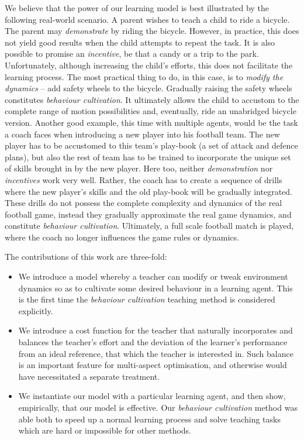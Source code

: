 We believe that the power of our learning model is best illustrated by
the following real-world scenario. A parent wishes to teach a child to
ride a bicycle. The parent may {\em demonstrate} by riding the
bicycle. However, in practice, this does not yield good results when
the child attempts to repeat the task. It is also possible to promise
an {\em incentive}, be that a candy or a trip to the
park. Unfortunately, although increasing the child's efforts, this
does not facilitate the learning process. The most practical thing to
do, in this case, is to {\em modify the dynamics} -- add safety wheels
to the bicycle. Gradually raising the safety wheels constitutes {\em
  behaviour cultivation}. It ultimately allows the child to accustom
to the complete range of motion possibilities and, eventually, ride an
unabridged bicycle version. Another good example, this time with
multiple agents, would be the task a coach faces when introducing a
new player into his football team. The new player has to be accustomed
to this team's play-book (a set of attack and defence plans), but also
the rest of team has to be trained to incorporate the unique set of
skills brought in by the new player. Here too, neither {\em
  demonstration} nor {\em incentives} work very well. Rather, the
coach has to create a sequence of drills where the new player's skills
and the old play-book will be gradually integrated. These drills do
not possess the complete complexity and dynamics of the real football
game, instead they gradually approximate the real game dynamics, and
constitute {\em behaviour cultivation}. Ultimately, a full scale
football match is played, where the coach no longer influences the
game rules or dynamics.

The contributions of this work are three-fold:
\begin{itemize}
\item We introduce a model whereby a teacher can modify or tweak
  environment dynamics so as to cultivate some desired behaviour in a
  learning agent. This is the first time the {\em behaviour
    cultivation} teaching method is considered explicitly.
\item We introduce a cost function for the teacher that naturally
  incorporates and balances the teacher's effort and the deviation of
  the learner's performance from an ideal reference, that which the
  teacher is interested in. Such balance is an important feature for
  multi-aspect optimisation, and otherwise would have necessitated a
  separate treatment.
\item We instantiate our model with a particular learning agent, and
  then show, empirically, that our model is effective. Our {\em
    behaviour cultivation} method was able both to speed up a normal
  learning process and solve teaching tasks which are hard or
  impossible for other methods.
\end{itemize}

